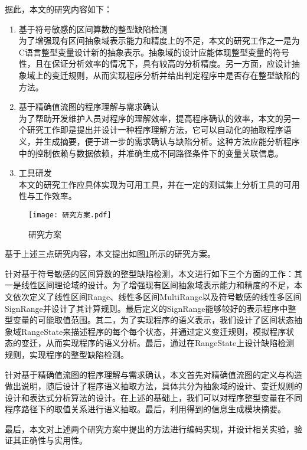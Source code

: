 据此，本文的研究内容如下：  
 \begin{enumerate}[1）]
	\item 基于符号敏感的区间算数的整型缺陷检测\\
	为了增强现有区间抽象域表示能力和精度上的不足，本文的研究工作之一是为C语言整型变量设计新的抽象表示。抽象域的设计应能体现整型变量的符号性，且在保证分析效率的情况下，具有较高的分析精度。另一方面，应设计抽象域上的变迁规则，从而实现程序分析并给出判定程序中是否存在整型缺陷的方法。
	
	\item 基于精确值流图的程序理解与需求确认\\
	为了帮助开发维护人员对程序的理解效率，提高程序确认的效率，本文的另一个研究工作即是提出并设计一种程序理解方法，它可以自动化的抽取程序语义，并生成摘要，便于进一步的需求确认与缺陷分析。这种方法应能分析程序中的控制依赖与数据依赖，并准确生成不同路径条件下的变量关联信息。
	
	\item 工具研发\\
	本文的研究工作应具体实现为可用工具，并在一定的测试集上分析工具的可用性与工作效率。 	
 \end{enumerate}

\begin{figure}[H]
	\centering
	\texttt{[image: 研究方案.pdf]}
	\caption{研究方案}
	\label{fig:研究方案}
\end{figure}

  基于上述三点研究内容，本文提出如图\ref{fig:研究方案}所示的研究方案。
  
  针对基于符号敏感的区间算数的整型缺陷检测，本文进行如下三个方面的工作：其一是线性区间理论域的设计。为了增强现有区间抽象域表示能力和精度的不足，本文依次定义了线性区间Range、线性多区间MultiRange以及符号敏感的线性多区间SignRange并设计了其计算规则。最后定义的SignRange能够较好的表示程序中整型变量的可能取值范围。其二，为了实现程序的语义表示，我们设计了区间状态抽象域RangeState来描述程序的每个每个状态，并通过定义变迁规则，模拟程序状态的变迁，从而实现程序的语义分析。最后，通过在RangeState上设计缺陷检测规则，实现程序的整型缺陷检测。
  
  针对基于精确值流图的程序理解与需求确认，本文首先对精确值流图的定义与构造做出说明，随后设计了程序语义抽取方法，具体共分为抽象域的设计、变迁规则的设计和表达式分析算法的设计。在上述的基础上，我们可以对程序整型变量在不同程序路径下的取值关系进行语义抽取。最后，利用得到的信息生成模块摘要。
  
  最后，本文对上述两个研究方案中提出的方法进行编码实现，并设计相关实验，验证其正确性与实用性。
 

